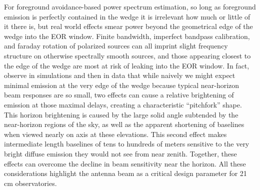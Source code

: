 \documentclass{emulateapj}
\begin{document}

For foreground avoidance-based power spectrum estimation, so long as foreground emission is perfectly contained in the wedge it is irrelevant how much or 
little of it there is, but real world effects smear power beyond the geometrical edge of the wedge into the EOR 
window. Finite bandwidth, imperfect bandpass calibration, and faraday rotation \citep{jelic2010,moore2013,giannisurvey, moore2013,moore2015,asad2015} of polarized sources can all imprint slight frequency structure on otherwise spectrally smooth sources, and those appearing closest to the edge of the wedge are 
most at risk of leaking into the EOR window. In fact, 
\citet{nithya15,nithya15b} observe in simulations and then in data that while naively we might expect minimal emission 
at the very edge of the wedge because typical near-horizon beam responses are so small, 
two effects can cause a relative brightening of emission at those maximal delays, creating a characteristic ``pitchfork'' shape. This horizon 
brightening is caused by the large solid angle subtended by the near-horizon regions of the 
sky, as well as the apparent shortening of baselines when viewed nearly on axis at these elevations. 
This second effect makes intermediate length baselines of tens to hundreds of meters sensitive to the very bright diffuse 
emission they would not see from near zenith. Together, these effects can overcome the decline in beam sensitivity near the horizon. 
All these considerations highlight the antenna beam as a critical design parameter for 
21\,cm observatories.
\end{document}
